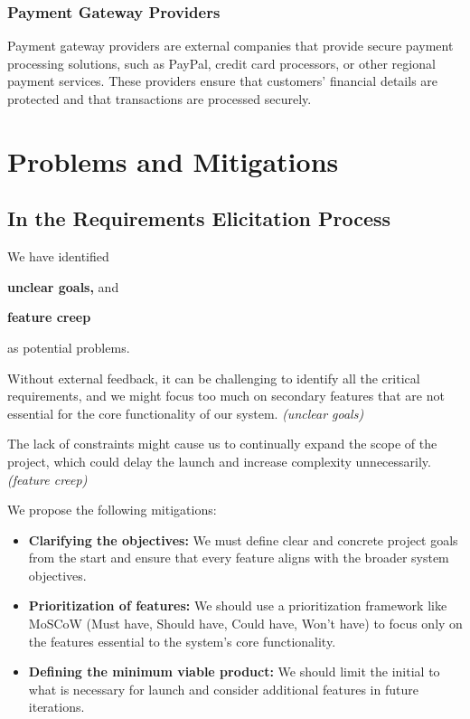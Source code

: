 \documentclass[a4paper,journal]{IEEEtran}
\begin{document}
\subsubsection{Payment Gateway Providers}
Payment gateway providers are external companies that provide secure payment
processing solutions, such as PayPal, credit card processors, or other regional
payment services.
These providers ensure that customers' financial details are protected and that
transactions are processed securely.

\section{Problems and Mitigations}
\subsection{In the Requirements Elicitation Process}
We have identified
\begin{enumerate*}
  \item \textbf{unclear goals,} and
  \item \textbf{feature creep}
\end{enumerate*}
as potential problems.

Without external feedback, it can be challenging to identify all the critical
requirements, and we might focus too much on secondary features that are not
essential for the core functionality of our system.
\textit{(unclear goals)}

The lack of constraints might cause us to continually expand the scope of the
project, which could delay the launch and increase complexity unnecessarily.
\textit{(feature creep)}

We propose the following mitigations:
\begin{itemize}
  \item \textbf{Clarifying the objectives:}
    We must define clear and concrete project goals from the start and ensure that
    every feature aligns with the broader system objectives.
  \item \textbf{Prioritization of features:}
    We should use a
    prioritization framework like MoSCoW (Must have, Should have, Could have,
    Won't have) to focus only on the features essential to the system’s core
    functionality.
  \item \textbf{Defining the minimum viable product:}
    We should limit the initial to what is necessary for launch and consider
    additional features in future iterations.
\end{itemize}
\end{document}
